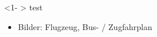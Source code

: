
\begin{frame}
	
	\begin{block} <1- > {test}
		\begin{itemize}
			\item <1- > Bilder: Flugzeug, Bus- / Zugfahrplan
		\end{itemize}
		
	\end{block}
\end{frame}


